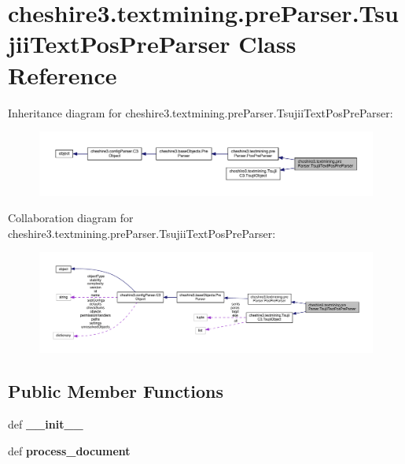 \hypertarget{classcheshire3_1_1textmining_1_1pre_parser_1_1_tsujii_text_pos_pre_parser}{\section{cheshire3.\-textmining.\-pre\-Parser.\-Tsujii\-Text\-Pos\-Pre\-Parser Class Reference}
\label{classcheshire3_1_1textmining_1_1pre_parser_1_1_tsujii_text_pos_pre_parser}
}


Inheritance diagram for cheshire3.\-textmining.\-pre\-Parser.\-Tsujii\-Text\-Pos\-Pre\-Parser\-:
\nopagebreak
\begin{figure}[H]
\begin{center}
\leavevmode
\includegraphics[width=350pt]{classcheshire3_1_1textmining_1_1pre_parser_1_1_tsujii_text_pos_pre_parser__inherit__graph}
\end{center}
\end{figure}


Collaboration diagram for cheshire3.\-textmining.\-pre\-Parser.\-Tsujii\-Text\-Pos\-Pre\-Parser\-:
\nopagebreak
\begin{figure}[H]
\begin{center}
\leavevmode
\includegraphics[width=350pt]{classcheshire3_1_1textmining_1_1pre_parser_1_1_tsujii_text_pos_pre_parser__coll__graph}
\end{center}
\end{figure}
\subsection*{Public Member Functions}
\begin{DoxyCompactItemize}
\item 
\hypertarget{classcheshire3_1_1textmining_1_1pre_parser_1_1_tsujii_text_pos_pre_parser_ae1b943a38687b9bc524131f5c2964d40}{def {\bfseries \-\_\-\-\_\-init\-\_\-\-\_\-}}\label{classcheshire3_1_1textmining_1_1pre_parser_1_1_tsujii_text_pos_pre_parser_ae1b943a38687b9bc524131f5c2964d40}

\item 
\hypertarget{classcheshire3_1_1textmining_1_1pre_parser_1_1_tsujii_text_pos_pre_parser_aa9c242dced955fe9ca9201ec21fbbc18}{def {\bfseries process\-\_\-document}}\label{classcheshire3_1_1textmining_1_1pre_parser_1_1_tsujii_text_pos_pre_parser_aa9c242dced955fe9ca9201ec21fbbc18}

\end{DoxyCompactItemize}
